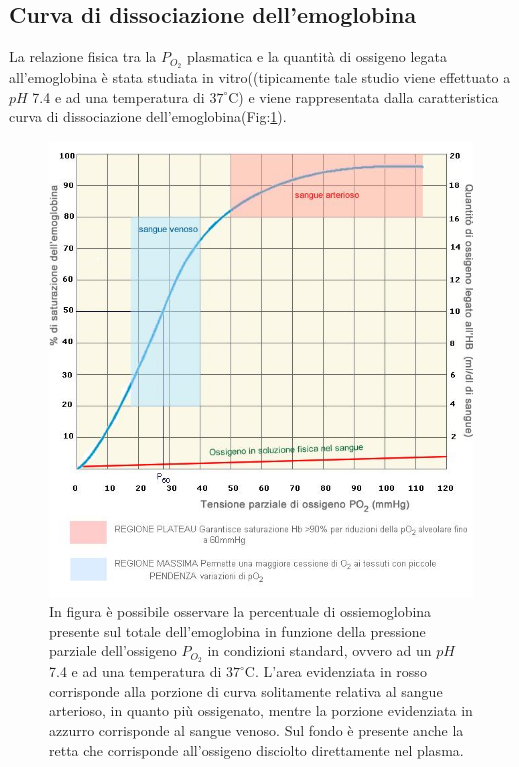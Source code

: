 \documentclass[12pt,a4paper, twoside, openright]{report}
\begin{document}
\subsection{Curva di dissociazione dell'emoglobina}

La relazione fisica tra la $P_{O_2}$ plasmatica e la quantità di ossigeno legata all'emoglobina è stata studiata in vitro((tipicamente tale studio viene effettuato a $pH$ 7.4 e ad una temperatura di $37^\circ$C) e viene rappresentata dalla caratteristica curva di dissociazione dell'emoglobina(Fig:\ref{fig:Dissociation Curve}). 
\begin{figure}[h!]
    \centering
    \includegraphics[width=\textwidth]{emoglobina2.jpeg}
    \caption{In figura è possibile osservare la percentuale di ossiemoglobina presente 					 sul totale dell'emoglobina in funzione della pressione parziale 							 dell'ossigeno $P_{O_2}$ in condizioni standard, ovvero ad un $pH$ 7.4 e ad 			 una temperatura di $37^\circ$C. 
			 L'area evidenziata in rosso corrisponde alla porzione di curva solitamente 			 relativa al sangue arterioso, in quanto più ossigenato, mentre la porzione 			 evidenziata in azzurro corrisponde al sangue venoso. 
			 Sul fondo è presente anche la retta che corrisponde all'ossigeno disciolto 			 direttamente nel plasma.}
    \label{fig:Dissociation Curve}
\end{figure}
\end{document}
